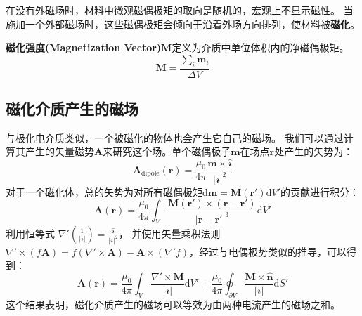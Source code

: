 \documentclass[fontset=none]{ctexart}
\begin{document}
在没有外磁场时，材料中微观磁偶极矩的取向是随机的，宏观上不显示磁性。
当施加一个外部磁场时，这些磁偶极矩会倾向于沿着外场方向排列，使材料被\textbf{磁化}。

\begin{definition}[磁化强度矢量]
    \textbf{磁化强度(Magnetization Vector)}$\bm{M}$定义为介质中单位体积内的净磁偶极矩。
    \begin{equation}
        \bm{M} = \frac{\sum_i \bm{m}_i}{\Delta V}
    \end{equation}
\end{definition}

\subsection{磁化介质产生的磁场}
与极化电介质类似，一个被磁化的物体也会产生它自己的磁场。
我们可以通过计算其产生的矢量磁势$\bm{A}$来研究这个场。单个磁偶极子$\bm{m}$在场点$\bm{r}$处产生的矢势为：
\begin{equation}
    \bm{A}_{\text{dipole}}(\bm{r}) = \frac{\mu_0}{4\pi} \frac{\bm{m} 
    \times \hat{\bm{\mathscr{r}}}}{|\bm{\mathscr{r}}|^2}
\end{equation}
对于一个磁化体，总的矢势为对所有磁偶极矩$\mathrm{d}\bm{m} = \bm{M}(\bm{r}')\mathrm{d}V'$的贡献进行积分：
\begin{equation}
    \bm{A}(\bm{r}) = \frac{\mu_0}{4\pi} \int_V \frac{\bm{M}(\bm{r}') 
    \times (\bm{r}-\bm{r}')}{|\bm{r}-\bm{r}'|^3} \mathrm{d}V'
\end{equation}
利用恒等式 $\nabla' \left(\frac{1}{|\bm{\mathscr{r}}|}\right) 
= \frac{\hat{\bm{\mathscr{r}}}}{|\bm{\mathscr{r}}|^2}$，
并使用矢量乘积法则 $\nabla' \times (f\bm{A}) = f(\nabla' \times \bm{A}) 
- \bm{A} \times (\nabla' f)$，经过与电偶极势类似的推导，可以得到：
\begin{equation}
    \bm{A}(\bm{r}) = \frac{\mu_0}{4\pi} \int_V \frac{\nabla' \times \bm{M}}
    {|\bm{\mathscr{r}}|} \mathrm{d}V' + \frac{\mu_0}{4\pi} \oint_{\partial V} 
    \frac{\bm{M} \times \hat{\bm{n}}}{|\bm{\mathscr{r}}|} \mathrm{d}S'
\end{equation}
这个结果表明，磁化介质产生的磁场可以等效为由两种电流产生的磁场之和。
\end{document}
